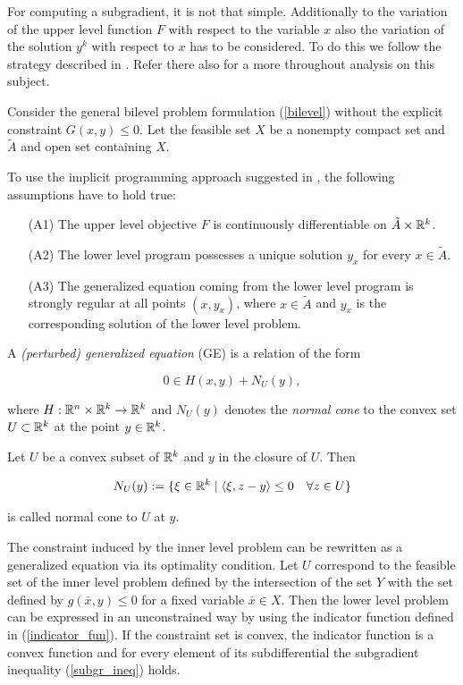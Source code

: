 For computing a subgradient, it is not that simple. Additionally to the variation of the upper level function \(F\) with respect to the variable \(x\) also the variation of the solution \(y^k\) with respect to \(x\) has to be considered.
To do this we follow the strategy described in \cite{Outrata1998}. Refer there also for a more throughout analysis on this subject.

Consider the general bilevel problem formulation (\ref{bilevel}) without the explicit constraint \(G(x,y) \leq 0\).
Let the feasible set \(X\) be a nonempty compact set and \(\tilde{A}\) and open set containing \(X\).

To use the implicit programming approach suggested in \cite{Outrata1998},  the following assumptions have to hold true:

\begin{itemize}
\item[(A1)] The upper level objective \(F\) is continuously differentiable on \(\tilde{A}\times \mathbb{R}^k\).
\item[(A2)] The lower level program possesses a unique solution \(y_x\) for every \(x\in \tilde{A}\).
\item[(A3)] The generalized equation coming from the lower level program is strongly regular at all points \((x,y_x)\), where \(x \in \tilde{A}\) and \(y_x\) is the corresponding solution of the lower level problem.
\end{itemize}

A \emph{(perturbed) generalized equation} (GE) is a relation of the form

\[ 0 \in H(x,y)+N_{U}(y), \]

where \(H:\mathbb{R}^n\times \mathbb{R}^k \to \mathbb{R}^k\) and \(N_{U}(y)\) denotes the \emph{normal cone} to the convex set \(U \subset \mathbb{R}^k\) at the point \(y\in \mathbb{R}^k\).

\begin{definition}
	Let \(U\) be a convex subset of \(\mathbb{R}^k\) and \(y\) in the closure of \(U\). Then
	
	\begin{equation*}
		N_U(y) := \{\xi\in \mathbb{R}^k \mid \left\langle \xi,z-y\right\rangle \leq 0 \quad \forall z \in U \}
	\label{norm_cone}
	\end{equation*}
	
	is called normal cone to \(U\) at \(y\).
\end{definition}
 
The constraint induced by the inner level problem can be rewritten as a generalized equation via its optimality condition.
Let \(U\) correspond to the feasible set of the inner level problem defined by the intersection of the set \(Y\) with the set defined by \(g(\bar{x},y)\leq 0\) for a fixed variable \(\bar{x} \in X \).
Then the lower level problem can be expressed in an unconstrained way by using the indicator function defined in (\ref{indicator_fun}). If the constraint set is convex, the indicator function is a convex function and for every element of its subdifferential the subgradient inequality (\ref{subgr_ineq}) holds.

